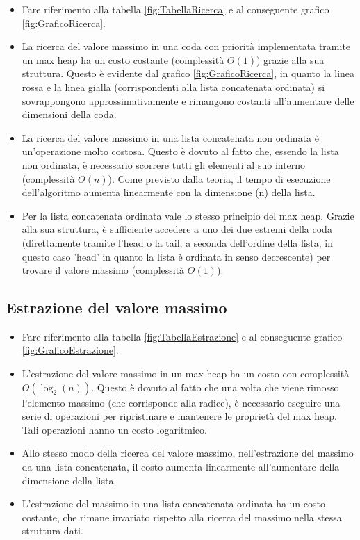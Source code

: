 \documentclass{article}
\begin{document}
\begin{itemize}
\item Fare riferimento alla tabella \ref{fig:TabellaRicerca} e al conseguente grafico \ref{fig:GraficoRicerca}.

\item La ricerca del valore massimo in una coda con priorità implementata tramite un max heap ha un costo costante (complessità $\Theta(1)$) grazie alla sua struttura. Questo è evidente dal grafico \ref{fig:GraficoRicerca}, in quanto la linea rossa e la linea gialla (corrispondenti alla lista concatenata ordinata) si sovrappongono approssimativamente e rimangono costanti all'aumentare delle dimensioni della coda.

\item La ricerca del valore massimo in una lista concatenata non ordinata è un'operazione molto costosa. Questo è dovuto al fatto che, essendo la lista non ordinata, è necessario scorrere tutti gli elementi al suo interno (complessità $\Theta(n)$). Come previsto dalla teoria, il tempo di esecuzione dell'algoritmo aumenta linearmente con la dimensione (n) della lista.

\item Per la lista concatenata ordinata vale lo stesso principio del max heap. Grazie alla sua struttura, è sufficiente accedere a uno dei due estremi della coda (direttamente tramite l'head o la tail, a seconda dell'ordine della lista, in questo caso 'head' in quanto la lista è ordinata in senso decrescente) per trovare il valore massimo (complessità $\Theta(1)$).

\end{itemize}

\subsection{Estrazione del valore massimo}

\begin{itemize}
\item Fare riferimento alla tabella \ref{fig:TabellaEstrazione} e al conseguente grafico \ref{fig:GraficoEstrazione}.

\item L'estrazione del valore massimo in un max heap ha un costo con complessità $O(\log_2(n))$. Questo è dovuto al fatto che una volta che viene rimosso l'elemento massimo (che corrisponde alla radice), è necessario eseguire una serie di operazioni per ripristinare e mantenere le proprietà del max heap. Tali operazioni hanno un costo logaritmico.

\item Allo stesso modo della ricerca del valore massimo, nell'estrazione del massimo da una lista concatenata, il costo aumenta linearmente all'aumentare della dimensione della lista.

\item L'estrazione del massimo in una lista concatenata ordinata ha un costo costante, che rimane invariato rispetto alla ricerca del massimo nella stessa struttura dati.

\end{itemize}
\end{document}
